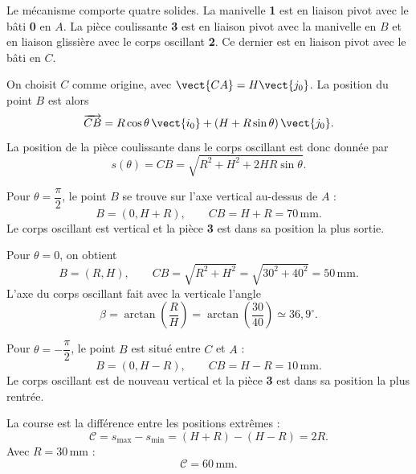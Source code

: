 \begin{corrigebox}

Le mécanisme comporte quatre solides. La manivelle \textbf{1} est en liaison
pivot avec le bâti \textbf{0} en $A$. La pièce coulissante \textbf{3} est en
liaison pivot avec la manivelle en $B$ et en liaison glissière avec le corps
oscillant \textbf{2}. Ce dernier est en liaison pivot avec le bâti en $C$.
\begin{center}
\end{center}

On choisit $C$ comme origine, avec $\vect{CA}=H\vect{j_0}$. La position du
point $B$ est alors
\[
\overrightarrow{CB}=R\cos\theta\,\vect{i_0}
 +\left(H+R\sin\theta\right)\vect{j_0}.
\]
La position de la pièce coulissante dans le corps oscillant est donc donnée
par
\[
s(\theta)=CB
=\sqrt{R^2+H^2+2HR\sin\theta}.
\]

Pour $\theta=\dfrac{\pi}{2}$, le point $B$ se trouve sur l'axe vertical au-dessus
de $A$ :
\[
B=(0,H+R),\qquad CB=H+R=70\,\mathrm{mm}.
\]
Le corps oscillant est vertical et la pièce \textbf{3} est dans sa position
la plus sortie.

Pour $\theta=0$, on obtient
\[
B=(R,H),\qquad CB=\sqrt{R^2+H^2}
=\sqrt{30^2+40^2}=50\,\mathrm{mm}.
\]
L'axe du corps oscillant fait avec la verticale l'angle
\[
\beta=\arctan\!\left(\frac{R}{H}\right)
=\arctan\!\left(\frac{30}{40}\right)\simeq36{,}9^\circ.
\]

Pour $\theta=-\dfrac{\pi}{2}$, le point $B$ est situé entre $C$ et $A$ :
\[
B=(0,H-R),\qquad CB=H-R=10\,\mathrm{mm}.
\]
Le corps oscillant est de nouveau vertical et la pièce \textbf{3} est dans
sa position la plus rentrée.

La course est la différence entre les positions extrêmes :
\[
\mathcal{C}=s_{\max}-s_{\min}
=(H+R)-(H-R)=2R.
\]
Avec $R=30\,\mathrm{mm}$ :
\[
\boxed{\mathcal{C}=60\,\mathrm{mm}}.
\]

\end{corrigebox}
